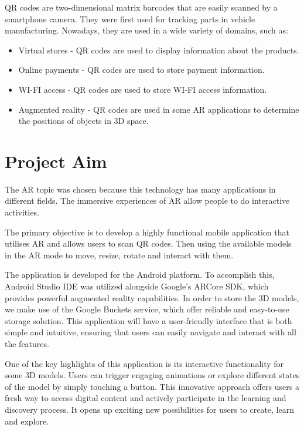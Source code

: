 \ac{QR} codes are two-dimensional matrix barcodes that are easily scanned by a smartphone camera. They were first used for tracking parts in vehicle manufacturing. Nowadays, they are used in a wide variety of domains, such as:
\begin{itemize}
    \item Virtual stores - \ac{QR} codes are used to display information about the products.
    \item Online payments - \ac{QR} codes are used to store payment information.
    \item WI-FI access - \ac{QR} codes are used to store WI-FI access information.
    \item Augmented reality - \ac{QR} codes are used in some \ac{AR} applications to determine the positions of objects in \ac{3D} space.
\end{itemize}


\section{Project Aim}
The AR topic was chosen because this technology has many applications in different fields. The immersive experiences of \ac{AR} allow people to do interactive activities.

The primary objective is to develop a highly functional mobile application that utilises \ac{AR} and allows users to scan \ac{QR} codes. Then using the available models in the \acf{AR} mode to move, resize, rotate and interact with them.

The application is developed for the Android platform. To accomplish this, Android Studio \ac{IDE} was utilized alongside Google's ARCore \ac{SDK}, which provides powerful augmented reality capabilities. In order to store the \ac{3D} models, we make use of the Google Buckets service, which offer reliable and easy-to-use storage solution. This application will have a user-friendly interface that is both simple and intuitive, ensuring that users can easily navigate and interact with all the features.

One of the key highlights of this application is its interactive functionality for some \ac{3D} models. Users can trigger engaging animations or explore different states of the model by simply touching a button. This innovative approach offers users a fresh way to access digital content and actively participate in the learning and discovery process. It opens up exciting new possibilities for users to create, learn and explore.

